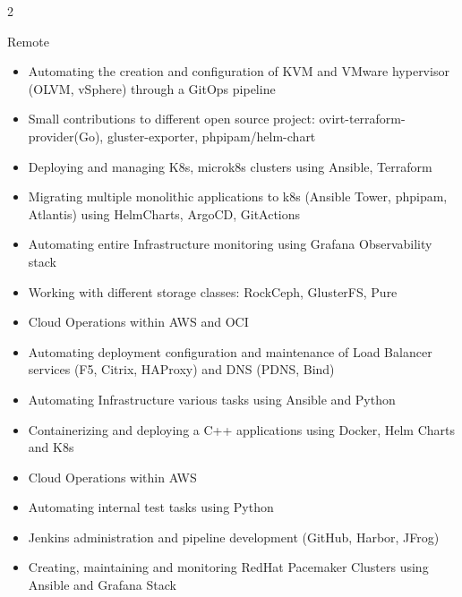 \documentclass[10pt,a4paper,ragged2e,withhyper]{altacv}
\begin{document}


\makecvheader


\begin{paracol}{2}

{Remote}
\begin{itemize}
\item Automating the creation and configuration of KVM and VMware hypervisor (OLVM, vSphere) through a GitOps pipeline
\item Small contributions to different open source project: ovirt-terraform-provider(Go), gluster-exporter, phpipam/helm-chart
\item Deploying and managing K8s, microk8s clusters using Ansible, Terraform
\item Migrating multiple monolithic applications to k8s (Ansible Tower, phpipam, Atlantis) using HelmCharts, ArgoCD, GitActions
\item Automating entire Infrastructure monitoring using Grafana \newline Observability stack
\item Working with different storage classes: RockCeph, GlusterFS, Pure
\item Cloud Operations within AWS and OCI
\item Automating deployment configuration and maintenance of Load Balancer services (F5, Citrix, HAProxy) and DNS (PDNS, Bind)
\item Automating Infrastructure various tasks using Ansible and Python
\end{itemize}
\divider
{}
\begin{itemize}
\item Containerizing and deploying a C++ applications using Docker, Helm Charts and K8s
\item Cloud Operations within AWS
\item Automating internal test tasks using Python
\item Jenkins administration and pipeline development (GitHub, \newline Harbor, JFrog)
\item Creating, maintaining and monitoring RedHat Pacemaker \newline Clusters using Ansible and Grafana Stack
\end{itemize}


\end{paracol}
\end{document}
